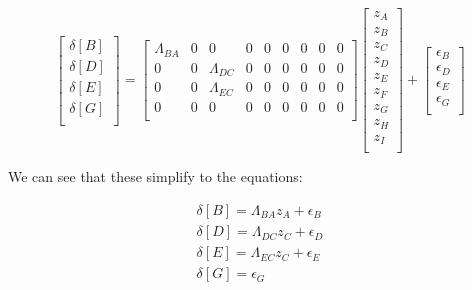 \documentclass[12pt]{article}
\begin{document}
\[
\begin{bmatrix}
                 \delta[B]  \\
                 \delta[D]  \\
                 \delta[E]  \\
                 \delta[G]  \\
         \end{bmatrix} = \begin{bmatrix}
                 \Lambda_{BA} & 0 & 0 & 0 & 0 & 0 & 0 & 0 & 0  \\
                 0 & 0 & \Lambda_{DC} & 0 & 0 & 0 & 0 & 0 & 0  \\
                 0 & 0 & \Lambda_{EC} & 0 & 0 & 0 & 0 & 0 & 0  \\
                 0 & 0 & 0 & 0 & 0 & 0 & 0 & 0 & 0  \\
         \end{bmatrix} \begin{bmatrix}
                 z_A  \\
                 z_B  \\
                 z_C  \\
                 z_D  \\
                 z_E  \\
                 z_F  \\
                 z_G  \\
                 z_H  \\
                 z_I \\
         \end{bmatrix} +  \begin{bmatrix}
                 \epsilon_B  \\
                 \epsilon_D  \\
                 \epsilon_E  \\
                 \epsilon_G  \\
         \end{bmatrix}
\]

We can see that these simplify to the equations:

\begin{gather*}
    \delta[B] = \Lambda_{BA}z_A + \epsilon_B\\
    \delta[D] = \Lambda_{DC}z_C  + \epsilon_D\\
    \delta[E] = \Lambda_{EC}z_C  + \epsilon_E\\
    \delta[G] = \epsilon_G\\
\end{gather*}
\end{document}
